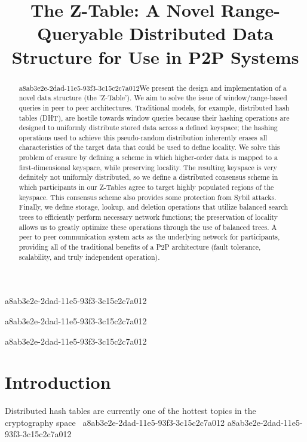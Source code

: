 \documentclass[12pt]{article}
\title{The Z-Table: A Novel Range-Queryable Distributed Data Structure for Use in P2P Systems}
\begin{document}
a8ab3e2e-2dad-11e5-93f3-3c15c2c7a012
\maketitle

a8ab3e2e-2dad-11e5-93f3-3c15c2c7a012\begin{abstract}
a8ab3e2e-2dad-11e5-93f3-3c15c2c7a012We present the design and implementation of a novel data structure (the 'Z-Table'). We aim to solve the issue of window/range-based queries in peer to peer architectures. Traditional models, for example,  distributed hash tables (DHT), are hostile towards window queries because their hashing operations are designed to uniformly distribute stored data across a defined keyspace; the hashing operations used to achieve this pseudo-random distribution inherently erases all characteristics of the target data that could be used to define locality. We solve this problem of erasure by defining a scheme in which higher-order data is mapped to a first-dimensional keyspace, while preserving locality. The resulting keyspace is very definitely not uniformly distributed, so we define a distributed consensus scheme in which participants in our Z-Tables agree to target highly populated regions of the keyspace. This consensus scheme also provides some protection from Sybil attacks. Finally, we define storage, lookup, and deletion operations that utilize balanced search trees to efficiently perform necessary network functions; the preservation of locality allows us to greatly optimize these operations through the use of balanced trees. A peer to peer communication system acts as the underlying network for participants, providing all of the traditional benefits of a P2P architecture (fault tolerance, scalability, and truly independent operation).
\end{abstract}

a8ab3e2e-2dad-11e5-93f3-3c15c2c7a012
\newpage
\section{Introduction}
Distributed hash tables are currently one of the hottest topics in the cryptography space~\cite{Stoica:2001dj,Rowstron:2001ea,Ratnasamy:2001wn}
a8ab3e2e-2dad-11e5-93f3-3c15c2c7a012
\printbibliography
a8ab3e2e-2dad-11e5-93f3-3c15c2c7a012
\end{document}
